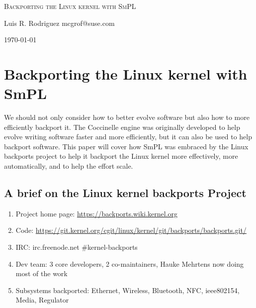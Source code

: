\documentclass[a4paper,10pt]{article}
\begin{document}
\begin{titlepage}
\begin{center}

\textsc{Backporting the Linux kernel with SmPL}\\[1.0cm]

\begin{minipage}{0.4\textwidth}
\begin{flushleft} \large
Luis R. Rodriguez mcgrof@suse.com
\end{flushleft}
\end{minipage}

\vfill

{\large \today}

\end{center}
\end{titlepage}

\section{Backporting the Linux kernel with SmPL}

We should not only consider how to better evolve software but also how to more
efficiently backport it. The Coccinelle engine was originally developed to help
evolve writing software faster and more efficiently, but it can also be used to
help backport software. This paper will cover how SmPL was embraced by the
Linux backports project to help it backport the Linux kernel more effectively,
more automatically, and to help the effort scale.

\subsection{A brief on the Linux kernel backports Project}

\begin{enumerate}
\item
Project home page: \url{https://backports.wiki.kernel.org}
\item
Code: \url{https://git.kernel.org/cgit/linux/kernel/git/backports/backports.git/}
\item
IRC: irc.freenode.net \#kernel-backports
\item
Dev team: 3 core developers, 2 co-maintainers, Hauke Mehrtens now doing most of the work
\item
Subsystems backported: Ethernet, Wireless, Bluetooth, NFC, ieee802154, Media, Regulator
\end{enumerate}
\end{document}
